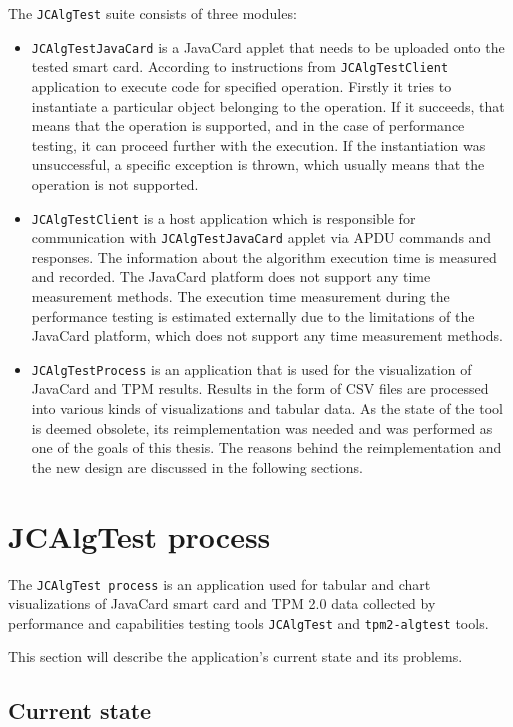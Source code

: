 The \texttt{JCAlgTest} suite consists of three modules:
\begin{itemize}
  \item
        \texttt{JCAlgTestJavaCard} is a JavaCard applet that needs to be uploaded onto the tested smart card. According to instructions from \texttt{JCAlgTestClient} application to execute code for specified operation. Firstly it tries to instantiate a particular object belonging to the operation. If it succeeds, that means that the operation is supported, and in the case of performance testing, it can proceed further with the execution. If the instantiation was unsuccessful, a specific exception is thrown, which usually means that the operation is not supported.
  \item
        \texttt{JCAlgTestClient} is a host application which is responsible for communication with \texttt{JCAlgTestJavaCard} applet via APDU commands and responses. The information about the algorithm execution time is measured and recorded. The JavaCard platform does not support any time measurement methods. The execution time measurement during the performance testing is estimated externally due to the limitations of the JavaCard platform, which does not support any time measurement methods. 
  \item
        \texttt{JCAlgTestProcess} is an application that is used for the visualization of JavaCard and TPM results. Results in the form of CSV files are processed into various kinds of visualizations and tabular data. As the state of the tool is deemed obsolete, its reimplementation was needed and was performed as one of the goals of this thesis. The reasons behind the reimplementation and the new design are discussed in the following sections.
\end{itemize}

\section{JCAlgTest process}
The \texttt{JCAlgTest process} is an application used for tabular and chart visualizations of JavaCard smart card and TPM 2.0 data collected by performance and capabilities testing tools \texttt{JCAlgTest} and \texttt{tpm2-algtest} tools. 

This section will describe the application's current state and its problems.
\subsection{Current state}

